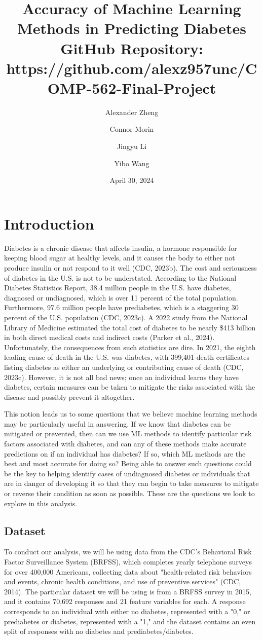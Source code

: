 \documentclass[]{article}
\title{
  Accuracy of Machine Learning Methods in Predicting Diabetes \\
  \vspace{5mm}
  \large GitHub Repository: https://github.com/alexz957unc/COMP-562-Final-Project}
\author{Alexander Zheng\and Connor Morin\and Jingyu Li\and Yibo Wang}
\date{April 30, 2024}
\begin{document}
\maketitle

\section{Introduction}
Diabetes is a chronic disease that affects insulin, a hormone responsible for keeping blood sugar at healthy levels, and it causes the body to either not produce insulin or not respond to it well (CDC, 2023b). The cost and seriousness of diabetes in the U.S. is not to be understated. According to the National Diabetes Statistics Report, 38.4 million people in the U.S. have diabetes, diagnosed or undiagnosed, which is over 11 percent of the total population. Furthermore, 97.6 million people have prediabetes, which is a staggering 30 percent of the U.S. population (CDC, 2023c). A 2022 study from the National Library of Medicine estimated the total cost of diabetes to be nearly \$413 billion in both direct medical costs and indirect costs (Parker et al., 2024). Unfortunately, the consequences from such statistics are dire. In 2021, the eighth leading cause of death in the U.S. was diabetes, with 399,401 death certificates listing diabetes as either an underlying or contributing cause of death (CDC, 2023c). However, it is not all bad news; once an individual learns they have diabetes, certain measures can be taken to mitigate the risks associated with the disease and possibly prevent it altogether.

This notion leads us to some questions that we believe machine learning methods may be particularly useful in answering. If we know that diabetes can be mitigated or prevented, then can we use ML methods to identify particular risk factors associated with diabetes, and can any of these methods make accurate predictions on if an individual has diabetes? If so, which ML methods are the best and most accurate for doing so? Being able to answer such questions could be the key to helping identify cases of undiagnosed diabetes or individuals that are in danger of developing it so that they can begin to take measures to mitigate or reverse their condition as soon as possible. These are the questions we look to explore in this analysis.

\subsection{Dataset}
To conduct our analysis, we will be using data from the CDC's Behavioral Risk Factor Surveillance System (BRFSS), which completes yearly telephone surveys for over 400,000 Americans, collecting data about "health-related risk behaviors and events, chronic health conditions, and use of preventive services" (CDC, 2014). The particular dataset we will be using is from a BRFSS survey in 2015, and it contains 70,692 responses and 21 feature variables for each. A response corresponds to an individual with either no diabetes, represented with a "0," or prediabetes or diabetes, represented with a "1," and the dataset contains an even split of responses with no diabetes and prediabetes/diabetes.
\end{document}

